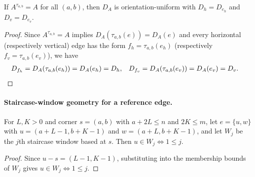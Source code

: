 \begin{lemma}%
    \label{thm:peps_torusUniformBondDim_of_translationInvariant}
    \leanok
    If $A^{\tau_{a,b}}=A$ for all $(a,b)$, then $D_A$ is orientation-uniform
    with $D_h=D_{e_h}$ and $D_v=D_{e_v}$.
\end{lemma}
\begin{proof}\leanok
    Since $A^{\tau_{a,b}}=A$ implies $D_A(\tau_{a,b}(e))=D_A(e)$ and every
    horizontal (respectively vertical) edge has the form $f_h=\tau_{a,b}(e_h)$
    (respectively $f_v=\tau_{a,b}(e_v)$), we have
    \begin{align}
        D_{f_h} & =D_A(\tau_{a,b}(e_h))=D_A(e_h)=D_h, &
        D_{f_v} & =D_A(\tau_{a,b}(e_v))=D_A(e_v)=D_v.
        \notag
    \end{align}
\end{proof}



\paragraph{Staircase-window geometry for a reference edge.}

\begin{lemma}%
    \label{lem:peps_reference_edge_left_endpoint_staircase_window}
    \leanok
    For $L,K>0$ and corner $s=(a,b)$ with $a+2L\le n$ and $2K\le m$, let
    $e=\{u,w\}$ with $u=(a+L-1,b+K-1)$ and $w=(a+L,b+K-1)$, and let $W_j$ be the
    $j$th staircase window based at $s$. Then $u\in W_j\iff 1\le j$.
\end{lemma}
\begin{proof}\leanok
    Since $u-s=(L-1,K-1)$, substituting into the membership bounds of $W_j$
    gives $u\in W_j\iff 1\le j$.
\end{proof}

